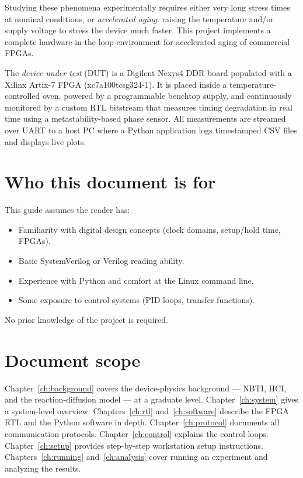 \documentclass[12pt, a4paper]{report}
\begin{document}
Studying these phenomena experimentally requires either very long stress times at
nominal conditions, or \emph{accelerated aging}: raising the temperature and/or supply
voltage to stress the device much faster. This project implements a complete hardware-in-the-loop
environment for accelerated aging of commercial FPGAs.

The \emph{device under test} (DUT) is a Digilent Nexys4 DDR board populated with a
Xilinx Artix-7 FPGA (xc7a100tcsg324-1). It is placed inside a temperature-controlled
oven, powered by a programmable benchtop supply, and continuously monitored by a
custom RTL bitstream that measures timing degradation in real time using a metastability-based
phase sensor. All measurements are streamed over UART to a host PC where a Python
application logs timestamped CSV files and displays live plots.

\section{Who this document is for}

This guide assumes the reader has:
\begin{itemize}
  \item Familiarity with digital design concepts (clock domains, setup/hold time, FPGAs).
  \item Basic SystemVerilog or Verilog reading ability.
  \item Experience with Python and comfort at the Linux command line.
  \item Some exposure to control systems (PID loops, transfer functions).
\end{itemize}

No prior knowledge of the project is required.

\section{Document scope}

Chapter~\ref{ch:background} covers the device-physics background --- NBTI, HCI, and the
reaction-diffusion model --- at a graduate level. Chapter~\ref{ch:system} gives a
system-level overview. Chapters~\ref{ch:rtl} and~\ref{ch:software} describe the FPGA
RTL and the Python software in depth. Chapter~\ref{ch:protocol} documents all
communication protocols. Chapter~\ref{ch:control} explains the control loops.
Chapter~\ref{ch:setup} provides step-by-step workstation setup instructions.
Chapters~\ref{ch:running} and~\ref{ch:analysis} cover running an experiment and
analyzing the results.
\end{document}
